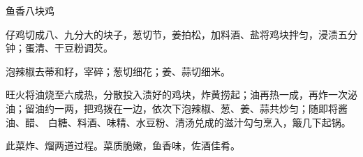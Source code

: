 \begin{recipe}{鱼香八块鸡}

\ingredients


\preparation

\step 仔鸡切成八、九分大的块子，葱切节，姜拍松，加料酒、盐将鸡块拌匀，浸渍五分
钟；蛋清、干豆粉调芡。

\step 泡辣椒去蒂和籽，宰碎；葱切细花；姜、蒜切细米。

\step 旺火将油烧至六成热，分散投入渍好的鸡块，炸黄捞起；油再热一成，再炸一次泌
油；留油约一两，把鸡拨在一边，依次下泡辣椒、葱、姜、蒜共炒匀；随即将酱油、醋、
白糖、料酒、味精、水豆粉、清汤兑成的滋汁勾匀烹入，簸几下起锅。

\features

此菜炸、熘两道过程。菜质脆嫩，鱼香味，佐酒佳肴。

\end{recipe}

